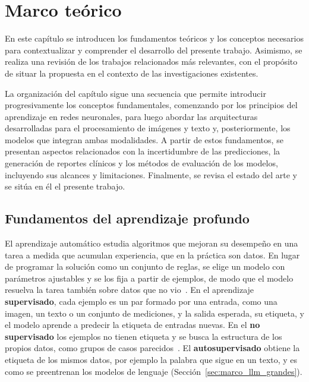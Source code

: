 \chapter[Marco teórico]{Marco teórico}
\label{cp:marco}

En este capítulo se introducen los fundamentos teóricos y los conceptos necesarios para contextualizar y
comprender el desarrollo del presente trabajo. Asimismo, se realiza una revisión de los trabajos relacionados
más relevantes, con el propósito de situar la propuesta en el contexto de las investigaciones existentes.

La organización del capítulo sigue una secuencia que permite introducir progresivamente los conceptos
fundamentales, comenzando por los principios del aprendizaje en redes neuronales, para luego abordar las
arquitecturas desarrolladas para el procesamiento de imágenes y texto y, posteriormente, los modelos que
integran ambas modalidades. A partir de estos fundamentos, se presentan aspectos relacionados con la
incertidumbre de las predicciones, la generación de reportes clínicos y los métodos de evaluación de los
modelos, incluyendo sus alcances y limitaciones. Finalmente, se revisa el estado del arte y se sitúa en él el
presente trabajo.

\section{Fundamentos del aprendizaje profundo}
\label{sec:marco_fundamentos}

El aprendizaje automático estudia algoritmos que mejoran su desempeño en una tarea a medida que acumulan
experiencia, que en la práctica son datos. En lugar de programar la solución como un conjunto de reglas, se
elige un modelo con parámetros ajustables y se los fija a partir de ejemplos, de modo que el modelo resuelva la
tarea también sobre datos que no vio~\cite{goodfellow2016deep}. En el aprendizaje \textbf{supervisado}, cada
ejemplo es un par formado por una entrada, como una imagen, un texto o un conjunto de mediciones, y la salida
esperada, su etiqueta, y el modelo aprende a predecir la etiqueta de entradas nuevas. En el \textbf{no
supervisado} los ejemplos no tienen etiqueta y se busca la estructura de los propios datos, como grupos de
casos parecidos~\cite{goodfellow2016deep}. El \textbf{autosupervisado} obtiene la etiqueta de los mismos datos,
por ejemplo la palabra que sigue en un texto, y es como se preentrenan los modelos de lenguaje
(Sección~\ref{sec:marco_llm_grandes}).

